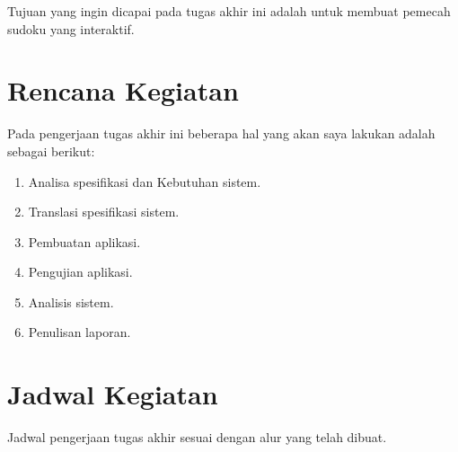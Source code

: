 Tujuan yang ingin dicapai pada tugas akhir ini adalah untuk membuat pemecah sudoku yang interaktif.

\section{Rencana Kegiatan}

Pada pengerjaan tugas akhir ini beberapa hal yang akan saya lakukan adalah sebagai berikut:
\begin{enumerate}
	\item Analisa spesifikasi dan Kebutuhan sistem.
	\item Translasi spesifikasi sistem.
	\item Pembuatan aplikasi.
	\item Pengujian aplikasi.
	\item Analisis sistem.
	\item Penulisan laporan.
	
\end{enumerate}

\section{Jadwal Kegiatan}

Jadwal pengerjaan tugas akhir sesuai dengan alur yang telah dibuat.

